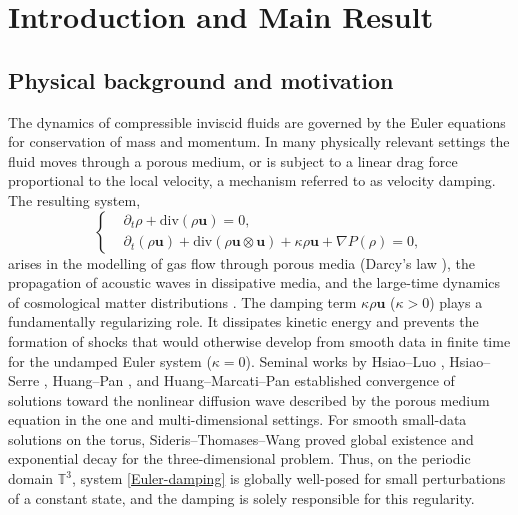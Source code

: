 \documentclass[12pt, reqno]{amsart}
\numberwithin{equation}{section}
\numberwithin{equation}{section}
\numberwithin{equation}{section}
\numberwithin{equation}{section}
\theoremstyle{remark}
\begin{document}
\maketitle

\tableofcontents



\section{Introduction and Main Result}
\label{sec1}

\subsection{Physical background and motivation}

The dynamics of compressible inviscid fluids are governed by the
Euler equations for conservation of mass and momentum.  In many
physically relevant settings the fluid moves through a porous medium,
or is subject to a linear drag force proportional to the local
velocity, a mechanism referred to as velocity damping.
The resulting system,
\begin{equation}\label{Euler-damping}
	\left\{
	\begin{aligned}
		&\partial_t \rho + \mathrm{div}(\rho \mathbf{u}) = 0, \\
		&\partial_t(\rho \mathbf{u}) + \mathrm{div}(\rho \mathbf{u}\otimes\mathbf{u})
		+ \kappa\rho\mathbf{u} + \nabla P(\rho) = 0,
	\end{aligned}
	\right.
\end{equation}
arises in the modelling of gas flow through porous media
(Darcy's law \cite{H-L,H-D}), the propagation of acoustic waves in
dissipative media, and the large-time dynamics of cosmological matter
distributions \cite{STW}.  The damping term $\kappa\rho\mathbf{u}$
($\kappa>0$) plays a fundamentally regularizing role. It dissipates
kinetic energy and prevents the formation of shocks that would otherwise
develop from smooth data in finite time for the undamped Euler system ($\kappa=0$).
Seminal works by Hsiao--Luo \cite{H-L}, Hsiao--Serre \cite{H-D},
Huang--Pan \cite{H-P}, and Huang--Marcati--Pan \cite{H-M-P} established
convergence of solutions toward the nonlinear diffusion wave described by
the porous medium equation in the one and multi-dimensional settings.
For smooth small-data solutions on the torus, Sideris--Thomases--Wang
\cite{STW} proved global existence and exponential decay for the
three-dimensional problem.  Thus, on the periodic domain $\mathbb{T}^3$,
 system \eqref{Euler-damping} is globally well-posed for small
perturbations of a constant state, and the damping is solely responsible
for this regularity.
\end{document}
